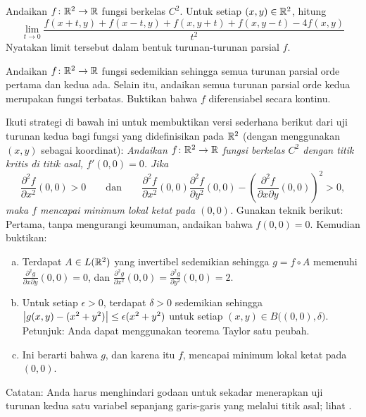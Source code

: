 \begin{exercise}
Andaikan $f \colon {\mathbb{R}}^2 \to {\mathbb{R}}$ fungsi berkelas $C^2$.
Untuk setiap $(x,y) \in {\mathbb{R}}^2$, hitung
\begin{equation*}
\lim_{t \to 0}
\frac{f(x+t,y)+f(x-t,y)+f(x,y+t)+f(x,y-t) - 4f(x,y)}{t^2}
\end{equation*}
Nyatakan limit tersebut dalam bentuk turunan-turunan parsial $f$.
\end{exercise}

\begin{exercise}
Andaikan $f \colon {\mathbb{R}}^2 \to {\mathbb{R}}$ fungsi sedemikian sehingga
semua turunan parsial orde pertama dan kedua ada.  Selain itu,
andaikan semua turunan parsial orde kedua merupakan fungsi terbatas.
Buktikan bahwa $f$ diferensiabel secara kontinu.
\end{exercise}

\begin{samepage}
\begin{exercise}
Ikuti strategi di bawah ini untuk
membuktikan versi sederhana berikut dari uji turunan kedua bagi
fungsi yang didefinisikan pada ${\mathbb{R}}^2$ (dengan menggunakan $(x,y)$ sebagai koordinat):  \emph{Andaikan $f \colon {\mathbb{R}}^2
\to {\mathbb{R}}$ fungsi berkelas $C^2$ dengan
titik kritis di titik asal, $f'(0,0) = 0$.  Jika
\begin{equation*}
\frac{\partial^2 f}{\partial x^2} (0,0) > 0 \qquad \text{dan} \qquad
\frac{\partial^2 f}{\partial x^2} (0,0) \frac{\partial^2 f}{\partial y^2}
(0,0) -
{\left(\frac{\partial^2 f}{\partial x \partial y} (0,0) \right)}^2 > 0 ,
\end{equation*}
maka $f$ mencapai minimum lokal ketat pada $(0,0)$.}
Gunakan teknik berikut:  Pertama, tanpa mengurangi keumuman, andaikan
bahwa $f(0,0) = 0$.  Kemudian buktikan:
\begin{enumerate}[a)]
\item
Terdapat $A \in L({\mathbb{R}}^2)$ yang invertibel sedemikian sehingga $g = f \circ A$
memenuhi $\frac{\partial^2 g}{\partial x \partial y} (0,0) = 0$, dan
$\frac{\partial^2 g}{\partial x^2} (0,0) =
\frac{\partial^2 g}{\partial y^2} (0,0) = 2$.
\item
Untuk setiap $\epsilon > 0$, terdapat $\delta > 0$
sedemikian sehingga 
$\bigl\lvert {g(x,y) - (x^2 + y^2)} \bigr\rvert \leq \epsilon (x^2+y^2)$ untuk setiap
$(x,y) \in B\bigl((0,0),\delta\bigr)$.\\
Petunjuk: Anda dapat menggunakan teorema Taylor satu peubah.
\item
Ini berarti bahwa $g$, dan karena itu $f$, mencapai minimum lokal
ketat pada $(0,0)$.
\end{enumerate}
Catatan: Anda harus menghindari godaan untuk sekadar
menerapkan uji turunan kedua satu variabel sepanjang garis-garis yang melalui
titik asal; lihat .
\end{exercise}
\end{samepage}
